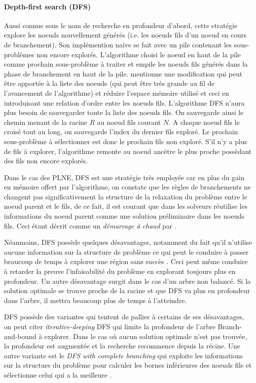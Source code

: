 \documentclass[12pt,a4paper,oneside]{book}
\theoremstyle{definition}
\begin{document}
	\paragraph{Depth-first search (DFS)}
	Aussi connue sous le nom de recherche en profondeur d'abord, cette stratégie explore les noeuds nouvellement générés (i.e. les noeuds fils d'un noeud en cours de branchement). Son implémention naïve se fait avec un pile contenant les sous-problèmes non encore explorés. L'algorithme choisi le noeud en haut de la pile comme prochain sous-problème à traiter et empile les noeuds fils générés dans la phase de branchement en haut de la pile. \cite{MORRISON201679} mentionne une modification qui peut être apportée à la liste des noeuds (qui peut être très grande au fil de l'avancement de l'algorithme) et réduire l'espace mémoire utilisé et ceci en introduisant une relation d'ordre entre les noeuds fils. L'algorithme DFS n'aura plus besoin de sauvegarder toute la liste des noeuds fils. On sauvegarde ainsi le chemin menant de la racine $R$ au noeud fils courant $N$. A chaque noeud fils le croisé tout au long, on sauvegarde l'index du dernier fils exploré. Le prochain sous-problème à sélectionner est donc le prochain fils non exploré. S'il n'y a plus de fils à explorer, l'algorithme remonte au noeud ancètre le plus proche possèdant des fils non encore explorés.
	
	Dans le cas des PLNE, DFS est une stratégie très employée car en plus du gain en mémoire offert par l'algorithme, on constate que les règles de branchements ne changent pas significativement la structure de la relaxation du problème entre le noeud parent et le fils, de ce fait, il est courant que dans les solveurs réutilise les informations du noeud parent comme une solution préliminaire dans les noeuds fils. Ceci étant décrit comme un \textit{démarrage à chaud} par \cite{Chinneck2004}.
	
	Néanmoins, DFS possède quelques désavantages, notamment du fait qu'il n'utilise aucune information sur la structure de problème ce qui peut  le conduire à passer beaucoup de temps à explorer une région sans succès \cite{Clausen99branchand}. Ceci peut même conduire à retarder la preuve l'infaisabilité du problème en explorant toujours plus en profondeur. Un autre désavantage surgit dans le cas d'un arbre non balancé. Si la solution optimale se trouve proche de la racine et que DFS va plus en profondeur dans l'arbre, il mettra beaucoup plus de temps à l'atteindre.
	
	DFS possède des variantes qui tentent de pallier à certains de ses désavantages, on peut citer \textit{iterative-deeping} DFS \cite{korf1985depth} qui limite la profondeur de l'arbre Branch-and-bound à explorer. Dans le cas où aucun solution optimale n'est pas trouvée, la profondeur est augmentée et la recherche recommence depuis la récine. Une autre variante est le \textit{DFS with complete branching} qui exploite les informations sur la structure du problème pour calculer les bornes inférieures des noeuds fils et sélectionne celui qui a la meilleure \cite{scholl1999balancing}.
	
\end{document}
